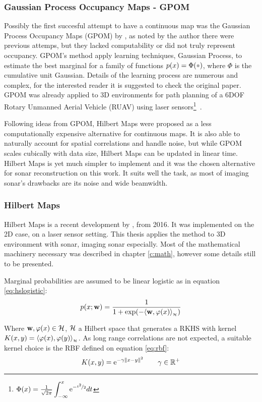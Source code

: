 \subsubsection{Gaussian
Process Occupancy Maps - GPOM}

Possibly the first succesful attempt to have a continuous map was the Gaussian
Process Occupancy Maps (GPOM) by \citet{o2012gaussian}, as noted by the author
there were previous attemps, but they lacked computability or did not truly
represent occupancy. GPOM's method apply learning techniques, Gaussian
Process, to estimate the best marginal for a family of functions
$p(x)=\Phi(\parm)$, where $\Phi$ is the cumulative unit Gaussian. Details of the
learning process are numerous and complex, for the interested reader it is
suggested to check the original paper. GPOM was already applied to 3D
environments for path planning of a 6DOF Rotary Unmanned Aerial Vehicle (RUAV)
using laser
sensors\footnote{$\Phi(x)=\frac{1}{\sqrt{2\pi}}\displaystyle\int_{-\infty}^x \mathrm{e}^{-\nicefrac{t^2}{2}}dt$}~\cite{gan20093d}.

Following ideas from GPOM, Hilbert Maps were proposed as a less computationally
expensive alternative for continuous maps. It is also able to naturally account
for spatial correlations and handle noise, but while GPOM scales cubically with
data size, Hilbert Maps can be updated in linear time. Hilbert Maps is yet much
simpler to implement and it was the chosen alternative for sonar reconstruction
on this work. It suits well the task, as most of imaging sonar's drawbacks are
its noise and wide beamwidth.

\subsubsection{Hilbert Maps}
\label{sss:hilbertcontinuousmap}
Hilbert Maps is a recent development by \citet{ramos2016hilbert}, from 2016. It
was implemented on the 2D case, on a laser sensor setting. This thesis applies
the method to 3D environment with sonar, imaging sonar especially. Most of the
mathematical machinery necessary was described in chapter \ref{c:math}, however
some details still to be presented.

Marginal probabilities are assumed to be linear logistic as in equation
\ref{eq:hslogistic}:
\begin{equation*}
p(x;\mathrm{\mathbf{w}}) = \frac{1}{1+\exp(-\langle \mathrm{\mathbf{w}},\varphi(x)\rangle_{_{\mathcal{H}}})}
\end{equation*}

Where $\mathrm{\mathbf{w}}, \varphi(x)\in\mathcal{H}$, $\mathcal{H}$ a Hilbert space that generates a RKHS
with kernel $K(x,y)=\langle \varphi(x),\varphi(y)\rangle_{_{\mathcal{H}}}$. As long range correlations
are not expected, a suitable kernel choice is the RBF defined on
equation \ref{eq:rbf}:
\begin{equation*}
K(x,y) = \mathrm{e}^{-\gamma\left\lVert x-y\right\rVert^2} \qquad \gamma \in \mathbb{R}^+
\end{equation*}

